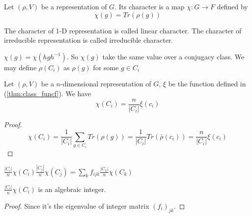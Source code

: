 \documentclass[12pt]{book}
\begin{document}
	\begin{definition}
		Let $(\rho,V)$ be a representation of $G$. Its character is a map $\chi: G\rightarrow F$ defined by
		\begin{equation}
			\chi(g)=Tr(\rho(g))
		\end{equation}
	\end{definition}
	\begin{definition}
		The character of 1-D representation is called linear character. The character of irreducible representation is called irreducible character.
	\end{definition}
	\begin{theorem}
		$\chi(g)=\chi(hgh^{-1})$. So $\chi(g)$ take the same value over a conjugacy class. We may define $\rho(C_i)$ as $\rho(g)$ for some $g\in C_i$
	\end{theorem}
	\begin{theorem}
		Let $(\rho,V)$ be a $n$-dimensional representation of $G$, $\xi$ be the function defined in (\ref{thm:class_funcf}). We have 
		\begin{equation}
			\chi(C_i)=\frac {n} {|C_i|}\xi(c_i)
		\end{equation}
	\end{theorem}
	\begin{proof}
		\begin{equation}
			\chi(C_i)=\frac 1 {|C_i|}\sum_{g\in C_i} Tr(\rho(g))=\frac 1 {|C_i|}Tr(\bar\rho(c_i))=\frac {n} {|C_i|}\xi(c_i)
		\end{equation}
	\end{proof}
	\begin{corollary}
		$\frac {|C_i|} {n} \chi(C_i)\frac {|C_j|} {n} \chi(C_j)=\sum_kf_{ijk}\frac {|C_k|} {n} \chi(C_k)$
	\end{corollary}
	\begin{corollary}
		$\frac {|C_i|} {n} \chi(C_i)$ is an algebraic integer.
	\end{corollary}
	\begin{proof}
		Since it's the eigenvalue of integer matrix $(f_i)_{jk}$.
	\end{proof}
	
\end{document}
